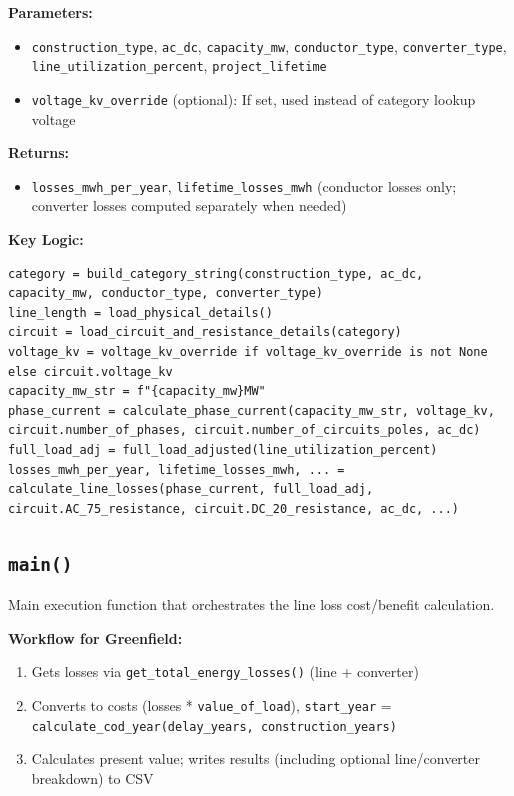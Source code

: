 \documentclass[ctcc_full_documentation.tex]{subfiles}
\begin{document}
\textbf{Parameters:}
\begin{itemize}
    \item \texttt{construction\_type}, \texttt{ac\_dc}, \texttt{capacity\_mw}, \texttt{conductor\_type}, \texttt{converter\_type}, \texttt{line\_utilization\_percent}, \texttt{project\_lifetime}
    \item \texttt{voltage\_kv\_override} (optional): If set, used instead of category lookup voltage
\end{itemize}

\textbf{Returns:}
\begin{itemize}
    \item \texttt{losses\_mwh\_per\_year}, \texttt{lifetime\_losses\_mwh} (conductor losses only; converter losses computed separately when needed)
\end{itemize}

\textbf{Key Logic:}
\begin{lstlisting}
category = build_category_string(construction_type, ac_dc, capacity_mw, conductor_type, converter_type)
line_length = load_physical_details()
circuit = load_circuit_and_resistance_details(category)
voltage_kv = voltage_kv_override if voltage_kv_override is not None else circuit.voltage_kv
capacity_mw_str = f"{capacity_mw}MW"
phase_current = calculate_phase_current(capacity_mw_str, voltage_kv, circuit.number_of_phases, circuit.number_of_circuits_poles, ac_dc)
full_load_adj = full_load_adjusted(line_utilization_percent)
losses_mwh_per_year, lifetime_losses_mwh, ... = calculate_line_losses(phase_current, full_load_adj, circuit.AC_75_resistance, circuit.DC_20_resistance, ac_dc, ...)
\end{lstlisting}

\subsection{\texttt{main()}}

Main execution function that orchestrates the line loss cost/benefit calculation.

\textbf{Workflow for Greenfield:}
\begin{enumerate}
    \item Gets losses via \texttt{get\_total\_energy\_losses()} (line + converter)
    \item Converts to costs (losses * \texttt{value\_of\_load}), \texttt{start\_year} = \texttt{calculate\_cod\_year(delay\_years, construction\_years)}
    \item Calculates present value; writes results (including optional line/converter breakdown) to CSV
\end{enumerate}
\end{document}
